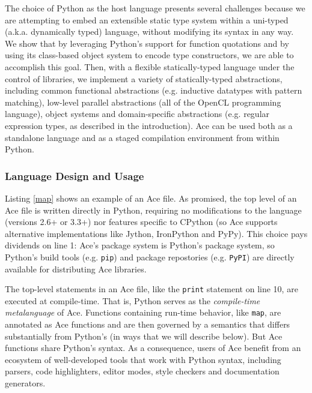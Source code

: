 The choice of Python as the host language presents several challenges because we are attempting to embed an extensible static type system within a uni-typed (a.k.a. dynamically typed) language, without modifying its syntax in any way. We show that by leveraging Python's support for function quotations and by using its class-based object system to encode type constructors, we are able to accomplish this goal. Then, with a flexible statically-typed language under the control of libraries, we implement a variety of statically-typed abstractions, including common functional abstractions (e.g. inductive datatypes with pattern matching), low-level parallel abstractions (all of the OpenCL programming language), object systems and domain-specific abstractions (e.g. regular expression types, as described in the introduction). Ace can be used both as a standalone language and as a staged compilation environment from within Python.

\subsubsection{Language Design and Usage}\label{usage}
Listing \ref{map} shows an example of an Ace file. As promised, the top level of an Ace file is written directly in Python, requiring no modifications to the language (versions 2.6+ or 3.3+) nor features specific to CPython (so Ace supports alternative implementations like Jython, IronPython and PyPy). This choice pays  dividends on line 1: Ace's package system is Python's package system, so Python's build tools (e.g. \verb|pip|) and package repostories (e.g. \verb|PyPI|) are directly available for distributing Ace libraries. 

The top-level statements in an Ace file, like the \verb|print| statement on line 10, are executed at compile-time. That is, Python serves as the \emph{compile-time metalanguage} of Ace. %
Functions containing run-time behavior, like \verb|map|, are annotated as Ace functions and are then governed by a semantics that differs substantially from Python's (in ways that we will describe below). But Ace functions share Python's syntax. As a consequence, users of Ace benefit from an ecosystem of well-developed tools that work with Python syntax, including parsers, code highlighters, editor modes, style checkers and documentation generators. 

